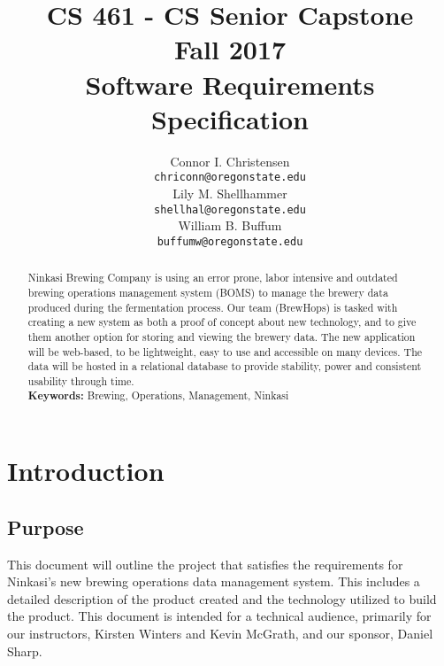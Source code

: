 \documentclass[draftclsnofoot,onecolumn,letterpaper,10pt,compsoc]{IEEEtran}
\title{CS 461 - CS Senior Capstone
	\\Fall 2017
	\\Software Requirements Specification
}
\author{
	Connor I. Christensen \\
	\texttt{chriconn@oregonstate.edu}
	\\
	Lily M. Shellhammer \\
	\texttt{shellhal@oregonstate.edu}
	\\
	William B. Buffum \\
	\texttt{buffumw@oregonstate.edu}
}
\begin{document}
\begin{titlingpage}
    \maketitle
    \begin{abstract}
			Ninkasi Brewing Company is using an error prone, labor intensive and outdated brewing operations management system (BOMS) to manage the brewery data produced during the fermentation process. Our team (BrewHops) is tasked with creating a new system as both a proof of concept about new technology, and to give them another option for storing and viewing the brewery data. The new application will be web-based, to be lightweight, easy to use and accessible on many devices. The data will be hosted in a relational database to provide stability, power and consistent usability through time.
			\\
			\textbf{Keywords:} Brewing, Operations, Management, Ninkasi
    \end{abstract}
		\pagebreak
		\tableofcontents
\end{titlingpage}

\section{Introduction}
	\subsection{Purpose}
	This document will outline the project that satisfies the requirements for Ninkasi’s new brewing operations data management system. This includes a detailed description of the product created and the technology utilized to build the product. This document is intended for a technical audience, primarily for our instructors, Kirsten Winters and Kevin McGrath, and our sponsor, Daniel Sharp.
\end{document}
